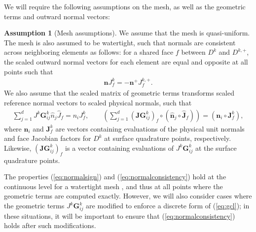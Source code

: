 \documentclass[preprint,10pt]{article}
\theoremstyle{definition}
\theoremstyle{lemma}
\theoremstyle{theorem}
\theoremstyle{assumption}
\newtheorem{assumption}{Assumption}
\renewcommand{\hat}{\widehat}
\newcommand{\LRp}[1]{\left( #1 \right)}
\newcommand{\lcwnote}[1]{{\color{gray}{#1}}}
\begin{document}
{We will require the following assumptions on the mesh, as well as the geometric terms and outward normal vectors:
\begin{assumption}[Mesh assumptions]
We assume that the mesh is quasi-uniform.  The mesh is also assumed to be watertight, such that normals are consistent across neighboring elements as follows: for a shared face $f$ between $D^k$ and $D^{k,+}$, the scaled outward normal vectors for each element are equal and opposite at all points such that 
\begin{align}
\bm{n}J^k_f = -\bm{n}^+J^{k,+}_f.
\label{eq:normalsign}
\end{align}
We also assume that the scaled matrix of geometric terms transforms scaled reference normal vectors to scaled physical normals, such that
\begin{align}
\sum_{j=1}^d J^k\bm{G}^k_{ij} \hat{n}_j\hat{J}_f = n_i J^k_f, \qquad \LRp{\sum_{j=1}^d \LRp{\bm{JG}^k_{ij}}_f \circ\LRp{\hat{\bm{n}}_j\circ\hat{\bm{J}}_f}}
= \LRp{\bm{n}_i\circ\bm{J}^k_f},
\label{eq:normalconsistency}
\end{align}
where $\bm{n}_i$ and $\bm{J}^k_f$ are vectors containing evaluations of the physical unit normals and face Jacobian factors for $D^k$ at surface quadrature points, respectively.
Likewise, $\LRp{\bm{JG}^k_{ij}}_f$ \lcwnote{(This could be written as $\bm{J}_f^{\bm{G}^k_{ij}}$.)} is a vector containing evaluations of $J^k\bm{G}^k_{ij}$ at the surface quadrature points.
\label{ass:norm}
\end{assumption}
The properties (\ref{eq:normalsign}) and (\ref{eq:normalconsistency}) hold at the continuous level for a watertight mesh \cite{ciarlet1978finite}, and thus at all points where the geometric terms are computed exactly.  However, we will also consider cases where the geometric terms $J^k\bm{G}^k_{ij}$ are modified to enforce a discrete form of (\ref{eq:gcl}); in these situations, it will be important to ensure that (\ref{eq:normalconsistency}) holds after such modifications.  

}
\end{document}
